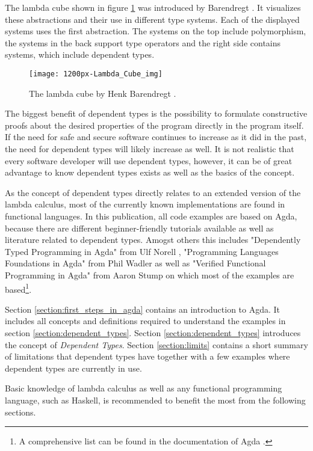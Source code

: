 The lambda cube shown in figure \ref{fig:lambda_cube} was introduced by Barendregt \cite{lambda_cube}. It visualizes these abstractions and their use in different type systems. Each of the displayed systems uses the first abstraction. 
The systems on the top include polymorphism, the systems in the back support type operators and the right side contains systems, which include dependent types.
\begin{figure}[h]
\centering
\texttt{[image: 1200px-Lambda\_Cube\_img]}
\caption{The lambda cube by Henk Barendregt \cite{lambda_cube}.}
\label{fig:lambda_cube}
\end{figure}

The biggest benefit of dependent types is the possibility to formulate constructive proofs about the desired properties of the program directly in the program itself.
If the need for safe and secure software continues to increase as it did in the past, the need for dependent types will likely increase as well.
It is not realistic that every software developer will use dependent types, however, it can be of great advantage to know dependent types exists as well as the basics of the concept.

As the concept of dependent types directly relates to an extended version of the lambda calculus, most of the currently known implementations are found in functional languages.
In this publication, all code examples are based on Agda, because there are different beginner-friendly tutorials available as well as literature related to dependent types. 
Amogst others this includes "Dependently Typed Programming in Agda" from Ulf Norell \cite{norell:deptyped}, "Programming Languages Foundations in Agda" from Phil Wadler \cite{plfa2019} as well as "Verified Functional Programming in Agda" from Aaron Stump \cite{10.1145/2841316} on which most of the examples are based\footnote{A comprehensive list can be found in the documentation of Agda \cite{AgdaReadTheDocs}.}.

Section \ref{section:first_steps_in_agda} contains an introduction to Agda.
It includes all concepts and definitions required to understand the examples in section \ref{section:dependent_types}.
Section \ref{section:dependent_types} introduces the concept of \emph{Dependent Types}.
Section \ref{section:limits} contains a short summary of limitations that dependent types have together with a few examples where dependent types are currently in use.

Basic knowledge of lambda calculus as well as any functional programming language, such as Haskell, is recommended to benefit the most from the following sections.
